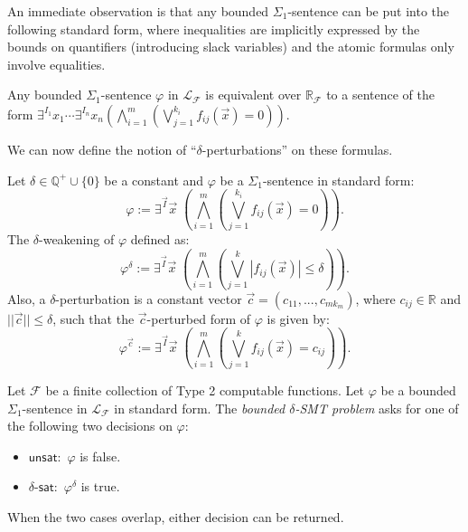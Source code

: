 \documentclass[envcountsect]{llncs}
\begin{document}
An immediate observation is that any bounded $\Sigma_1$-sentence
can be put into the following standard form, where inequalities are implicitly
expressed by the bounds on quantifiers (introducing slack variables) and the
atomic formulas only involve equalities.
\begin{proposition}\label{pre1}
Any bounded $\Sigma_1$-sentence $\varphi$ in $\mathcal{L}_{\mathcal{F}}$ is
equivalent over $\mathbb{R}_{\mathcal{F}}$ to a sentence of the form
$\exists^{I_1}x_1\cdots \exists^{I_n}x_n(\bigwedge_{i=1}^m(\bigvee_{j=1}^{k_i}
f_{ij}(\vec x)=0)).$
\end{proposition}

We can now define the notion of ``$\delta$-perturbations'' on these
formulas.
\begin{definition}\label{weak-def}
Let $\delta\in \mathbb{Q}^+\cup\{0\}$ be a constant and $\varphi$ be a
$\Sigma_1$-sentence in standard form:
\[\varphi:= \exists^{\vec I}\vec x\;(\bigwedge_{i=1}^m (\bigvee_{j=1}^{k_i}
f_{ij}(\vec x)= 0)).
\]
The $\delta$-weakening of $\varphi$ defined as:
\[\varphi^{\delta}:= \exists^{\vec I} \vec x\;(\bigwedge_{i=1}^m(\bigvee_{j=1}^k
|f_{ij}(\vec x)|\leq \delta)).\]
Also, a $\delta$-perturbation is a constant vector $\vec c =
(c_{11},...,c_{mk_m})$, where $c_{ij}\in\mathbb{R}$ and $||\vec
c||\leq\delta$, such that the $\vec c$-perturbed form of $\varphi$ is given by:
\[\varphi^{\vec c}:= \exists^{\vec I} \vec x\;(\bigwedge_{i=1}^m(\bigvee_{j=1}^k
f_{ij}(\vec x) = c_{ij})).\]
\end{definition}

\begin{definition} Let
$\mathcal{F}$ be a finite collection of Type 2 computable functions. Let
$\varphi$ be a bounded $\Sigma_1$-sentence in $\mathcal{L}_{\mathcal{F}}$ in
standard form. The {\em bounded $\delta$-SMT problem} asks for one of the
following two decisions on $\varphi$:
\begin{itemize}
\item $\mathsf{unsat}:$ $\varphi$ is false.
\item $\delta$-$\mathsf{sat}:$ $\varphi^{\delta}$ is true.
\end{itemize}
When the two cases overlap, either decision can be returned.
\end{definition}
\end{document}
